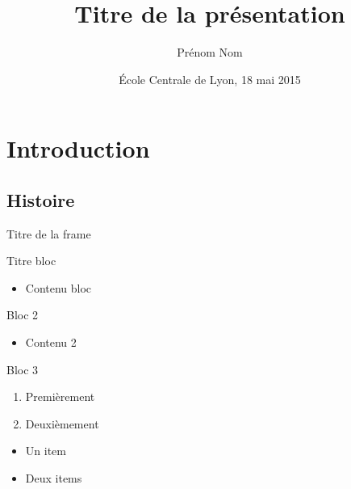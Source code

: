 \documentclass[10pt]{beamer}
\title{Titre de la présentation}
\author{Prénom Nom}
\date{\'Ecole Centrale de Lyon, 18 mai 2015}
\institute{\texttt{[image: logo.png]}}
\begin{document}
\begin{frame}
    	\maketitle
\end{frame}


\section{Introduction}
\subsection{Histoire}
\begin{frame}{Titre de la frame}

\begin{block}{Titre bloc}
\begin{itemize}
\item Contenu bloc
\end{itemize}
\end{block}

\begin{alertblock}{Bloc 2}
\begin{itemize}
\item Contenu 2
\end{itemize}
\end{alertblock}

\begin{exampleblock}{Bloc 3}
\begin{enumerate}
\item Premièrement
\item Deuxièmement
\end{enumerate}
\end{exampleblock}

\begin{itemize}
\item Un item
\item Deux items
\end{itemize}




\end{frame}
\end{document}
